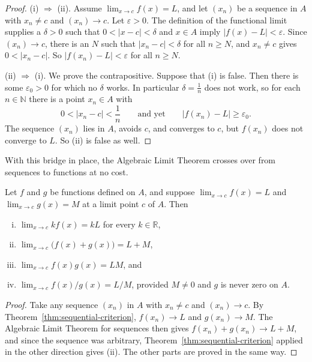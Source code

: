 \begin{proof}
(i) $\Rightarrow$ (ii).  Assume $\lim_{x \to c} f(x) = L$, and let $(x_n)$ be a sequence in $A$ with $x_n \neq c$ and $(x_n) \to c$.  Let $\varepsilon > 0$.  The definition of the functional limit supplies a $\delta > 0$ such that $0 < |x - c| < \delta$ and $x \in A$ imply $|f(x) - L| < \varepsilon$.  Since $(x_n) \to c$, there is an $N$ such that $|x_n - c| < \delta$ for all $n \geq N$, and $x_n \neq c$ gives $0 < |x_n - c|$.  So $|f(x_n) - L| < \varepsilon$ for all $n \geq N$.

(ii) $\Rightarrow$ (i).  We prove the contrapositive.  Suppose that (i) is false.  Then there is some $\varepsilon_0 > 0$ for which no $\delta$ works.  In particular $\delta = \frac1n$ does not work, so for each $n \in \mathbb{N}$ there is a point $x_n \in A$ with
\[ 0 < |x_n - c| < \frac1n \qquad \text{and yet} \qquad |f(x_n) - L| \geq \varepsilon_0. \]
The sequence $(x_n)$ lies in $A$, avoids $c$, and converges to $c$, but $f(x_n)$ does not converge to $L$.  So (ii) is false as well.
\end{proof}


With this bridge in place, the Algebraic Limit Theorem crosses over from sequences to functions at no cost.

\begin{corollary}\label{cor:alt-functions}
Let $f$ and $g$ be functions defined on $A$, and suppose $\lim_{x \to c} f(x) = L$ and $\lim_{x \to c} g(x) = M$ at a limit point $c$ of $A$.  Then
\begin{enumerate}[(i)]
	\item $\lim_{x \to c} k f(x) = kL$ for every $k \in \mathbb{R}$,
	\item $\lim_{x \to c} \big(f(x) + g(x)\big) = L + M$,
	\item $\lim_{x \to c} f(x) g(x) = LM$, and
	\item $\lim_{x \to c} f(x)/g(x) = L/M$, provided $M \neq 0$ and $g$ is never zero on $A$.
\end{enumerate}
\end{corollary}

\begin{proof}
Take any sequence $(x_n)$ in $A$ with $x_n \neq c$ and $(x_n) \to c$.  By Theorem~\ref{thm:sequential-criterion}, $f(x_n) \to L$ and $g(x_n) \to M$.  The Algebraic Limit Theorem for sequences then gives $f(x_n) + g(x_n) \to L + M$, and since the sequence was arbitrary, Theorem~\ref{thm:sequential-criterion} applied in the other direction gives (ii).  The other parts are proved in the same way.
\end{proof}

